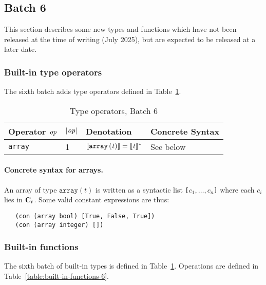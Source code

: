 \renewcommand{\note}[1]{
  \bigskip
  \refstepcounter{notenumberF}
  \noindent\textbf{Note \thenotenumberF. #1}
}
\newpage
\subsection{Batch 6}
\label{sec:default-builtins-6}
This section describes some new types and functions which have not been released
at the time of writing (July 2025), but are expected to be released at a later
date.

\subsubsection{Built-in type operators}
\label{sec:built-in-type-operators-6}
The sixth batch adds type operators defined in Table~\ref{table:built-in-type-operators-6}. 

\begin{table}[H]
  \centering
    \begin{tabular}{|l|p{14mm}|l|l|}
        \hline
        Operator $\textit{op}$ & $\left|\textit{op}\right|$  & Denotation & Concrete Syntax\\
        \hline
        \texttt{array} 
          & 1 
          & $\llbracket\mathit{\mathtt{array}\,\mathtt{(}t\mathtt{)}}\rrbracket = \llbracket\mathit{t}\rrbracket^*$ 
          & See below\\
        \hline
        \end{tabular}
   \caption{Type operators, Batch 6}
    \label{table:built-in-type-operators-6}
\end{table}

\paragraph{Concrete syntax for arrays.}
An array of type $\texttt{array}(t)$ is written as a syntactic list
\texttt{[$c_1, \ldots, c_n$]} where each $c_i$ lies in $\mathbf{C}_t$.
Some valid constant expressions are thus:
\begin{verbatim}
   (con (array bool) [True, False, True])
   (con (array integer) [])
\end{verbatim}

\subsubsection{Built-in functions}
\label{sec:built-in-functions-6}
The sixth batch of built-in types is defined in Table~\ref{table:built-in-type-operators-6}.
Operations are defined in Table~\ref{table:built-in-functions-6}.

